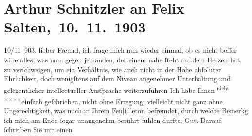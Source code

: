 

         
         \renewcommand{\erwaehntePersonen}{Personen: Felix Salten}
         \renewcommand{\erwaehnteOrte}{Orte: Wien}
         \renewcommand{\erwaehnteWerke}{Werke: Arthur Schnitzler und sein »Reigen«}
               \section[ Arthur Schnitzler an Felix Salten, 10. 11. 1903]{ Arthur Schnitzler an Felix Salten, 10. 11. 1903}\nopagebreak{}\rehead{ }\begin{ledgroupsized}[t]{13cm}\normalsize\beginnumbering{} \toendnotes[C]{\smallbreak\pagebreak[2]} 
\toendnotes[C]{\smallbreak}\pstart
           \raggedleft{}{\pb}10/11 903.\pend
           \pstart
           lieber Freund, ich frage mich nun wieder einmal, ob es nicht beſſer
               wäre alles, was man gegen jemanden, der einem nahe ſteht auf dem Herzen hat, zu
               verſchweigen, um ein Verhältnis, wie auch nicht in der Höhe abſoluter Ehrlichkeit,
               doch wenigſtens auf dem Niveau angenehmer Unterhaltung {\pb}und gelegentlicher intellectueller Ausſprache
                  weiterzuführen{\dotstwo} Ich habe Ihnen \substVorne{}\textsuperscript{nicht \textcolor{gray}{×}\-\textcolor{gray}{×}\-\textcolor{gray}{×}\-\textcolor{gray}{×}}{\allowbreak}\substDazwischen{}einfach geſchrie\substHinten{}ben, nicht ohne Erregung, vielleicht nicht ganz ohne Ungerechtigkeit, was
               mich in Ihrem Feu{[}i{]}lleton befremdet, durch welche Bemerkg ich mich
               am Ende ſogar unangenehm berührt fühlen durfte. Gut. Darauf ſchreiben Sie mir einen

\end{ledgroupsized}
